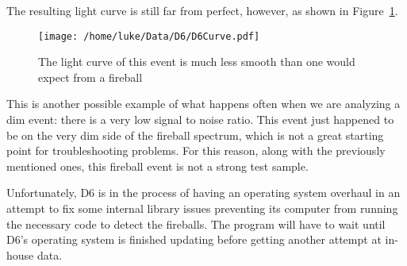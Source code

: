 The resulting light curve is still far from perfect, however, as shown in Figure~\ref{fig:D6LightCurve}.
\begin{figure}[ht!]
	\centering
	\texttt{[image: /home/luke/Data/D6/D6Curve.pdf]}
	\caption{The light curve of this event is much less smooth than one would expect from a fireball}
	\label{fig:D6LightCurve}
\end{figure}
This is another possible example of what happens often when we are analyzing a dim event: there is a very low signal to noise ratio. This event just happened to be on the very dim side of the fireball spectrum, which is not a great starting point for troubleshooting problems. For this reason, along with the previously mentioned ones, this fireball event is not a strong test sample. 

Unfortunately, D6 is in the process of having an operating system overhaul in an attempt to fix some internal library issues preventing its computer from running the necessary code to detect the fireballs. The program will have to wait until D6's operating system is finished updating before getting another attempt at in-house data. 
